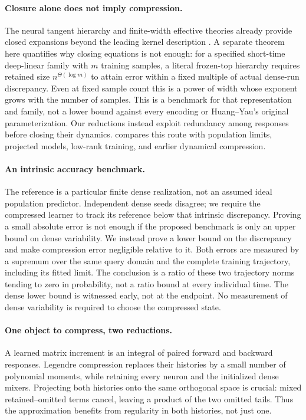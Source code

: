 \documentclass[11pt]{article}
\theoremstyle{definition}
\theoremstyle{remark}
\begin{document}
\paragraph{Closure alone does not imply compression.}
The neural tangent hierarchy and finite-width effective theories already
provide closed expansions beyond the leading kernel description
\cite{huang2020nth,dyer2020asymptotics,roberts2021principles}.
A separate theorem here quantifies why closing equations is not enough:
for a specified short-time deep-linear family with $m$ training samples,
a literal frozen-top hierarchy requires retained size
$n^{\Theta(\log m)}$ to attain error within a fixed multiple of actual
dense-run discrepancy. Even at fixed sample count this is a power of width
whose exponent grows with the number of samples.
This is a benchmark for that representation and family, not a lower bound
against every encoding or Huang--Yau's original parameterization.
Our reductions instead exploit redundancy among responses before closing
their dynamics.  compares this route with population limits,
projected models, low-rank training, and earlier dynamical compression.

\paragraph{An intrinsic accuracy benchmark.}
The reference is a particular finite dense realization, not an assumed ideal
population predictor. Independent dense seeds disagree; we require the
compressed learner to track its reference below that intrinsic discrepancy.
Proving a small absolute error is not enough if the proposed benchmark is
only an upper bound on dense variability. We instead prove a lower bound on
the discrepancy and make compression error negligible relative to it.
Both errors are measured by a supremum over the same query domain and the
complete training trajectory, including its fitted limit. The conclusion is
a ratio of these two trajectory norms tending to zero in probability, not a
ratio bound at every individual time. The dense lower bound is witnessed
early, not at the endpoint. No measurement of dense variability is required
to choose the compressed state.

\paragraph{One object to compress, two reductions.}
A learned matrix increment is an integral of paired forward and backward
responses. Legendre compression replaces their histories by a small number of
polynomial moments, while retaining every neuron and the initialized dense
mixers. Projecting both histories onto the same orthogonal space is crucial:
mixed retained--omitted terms cancel, leaving a product of the two omitted
tails. Thus the approximation benefits from regularity in both histories,
not just one.
\end{document}
